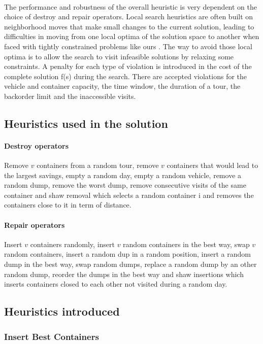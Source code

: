 \documentclass[12pt,a4paper]{article}
\begin{document}
\paragraph{}
The performance and robustness of the overall heuristic is very dependent on the choice of destroy and repair operators. Local search heuristics are often built on neighborhood moves that make small changes to the current solution, leading to difficulties in moving from one local optima of the solution space to another when faced with tightly constrained problems like ours \citep{RopkeTW}. The way to avoid those local optima is to allow the search to visit infeasible solutions by relaxing some constraints. A penalty for each type of violation is introduced in the cost of the complete solution f(s) during the search. There are accepted violations for the vehicle and container capacity, the time window, the duration of a tour, the backorder limit and the inaccessible visits.

\subsection{Heuristics used in the solution}
\paragraph{Destroy operators}Remove $v$ containers from a random tour, remove $v$ containers that would lead to the largest savings, empty a random day, empty a random vehicle, remove a random dump, remove the worst dump, remove consecutive visits of the same container and shaw removal which selects a random container i and removes the containers close to it in term of distance.
\paragraph{Repair operators}Insert $v$ containers randomly, insert $v$ random containers in the best way, swap $v$ random containers, insert a random dup in a random position, insert a random dump in the best way, swap random dumps, replace a random dump by an other random dump, reorder the dumps in the best way and shaw insertions which inserts containers closed to each other not visited during a random day.  
\subsection{Heuristics introduced}

\subsubsection{Insert Best Containers}
\end{document}
